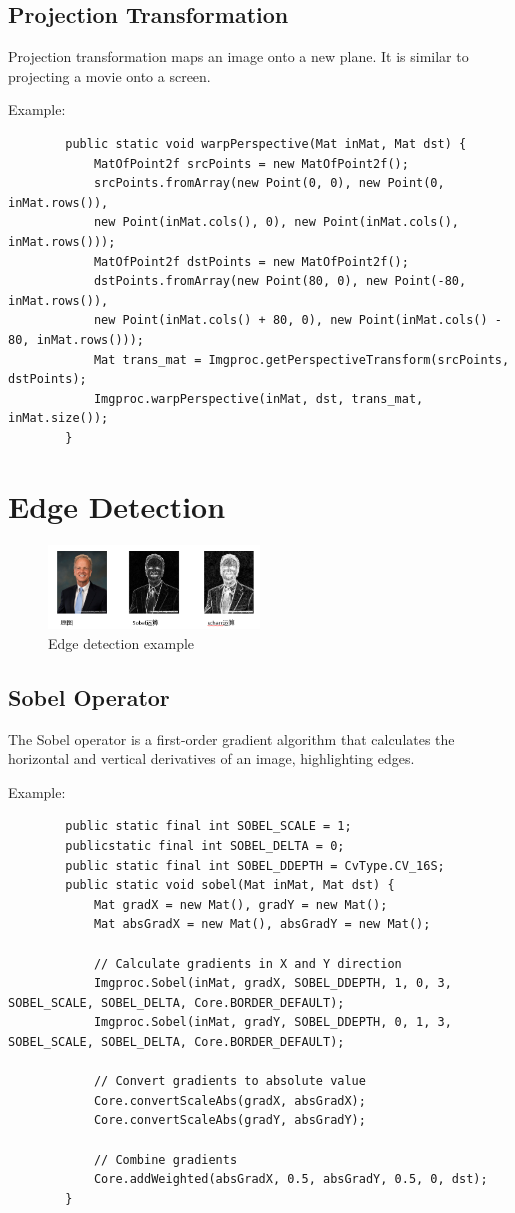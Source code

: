 \documentclass{article}
\begin{document}
	\subsection{Projection Transformation}
	Projection transformation maps an image onto a new plane. It is similar to projecting a movie onto a screen.
	
	Example:
	\begin{verbatim}
		public static void warpPerspective(Mat inMat, Mat dst) {
			MatOfPoint2f srcPoints = new MatOfPoint2f();
			srcPoints.fromArray(new Point(0, 0), new Point(0, inMat.rows()), 
			new Point(inMat.cols(), 0), new Point(inMat.cols(), inMat.rows()));
			MatOfPoint2f dstPoints = new MatOfPoint2f();
			dstPoints.fromArray(new Point(80, 0), new Point(-80, inMat.rows()), 
			new Point(inMat.cols() + 80, 0), new Point(inMat.cols() - 80, inMat.rows()));
			Mat trans_mat = Imgproc.getPerspectiveTransform(srcPoints, dstPoints);
			Imgproc.warpPerspective(inMat, dst, trans_mat, inMat.size());
		}
	\end{verbatim}
	
	\section{Edge Detection}
	\begin{figure}[h]
		\centering
		\includegraphics[width=0.5\textwidth]{mdpic/20240919165105.png}
		\caption{Edge detection example}
	\end{figure}
	
	\subsection{Sobel Operator}
	The Sobel operator is a first-order gradient algorithm that calculates the horizontal and vertical derivatives of an image, highlighting edges.
	
	Example:
	\begin{verbatim}
		public static final int SOBEL_SCALE = 1;
		publicstatic final int SOBEL_DELTA = 0;
		public static final int SOBEL_DDEPTH = CvType.CV_16S;
		public static void sobel(Mat inMat, Mat dst) {
			Mat gradX = new Mat(), gradY = new Mat();
			Mat absGradX = new Mat(), absGradY = new Mat();
			
			// Calculate gradients in X and Y direction
			Imgproc.Sobel(inMat, gradX, SOBEL_DDEPTH, 1, 0, 3, SOBEL_SCALE, SOBEL_DELTA, Core.BORDER_DEFAULT);
			Imgproc.Sobel(inMat, gradY, SOBEL_DDEPTH, 0, 1, 3, SOBEL_SCALE, SOBEL_DELTA, Core.BORDER_DEFAULT);
			
			// Convert gradients to absolute value
			Core.convertScaleAbs(gradX, absGradX);
			Core.convertScaleAbs(gradY, absGradY);
			
			// Combine gradients
			Core.addWeighted(absGradX, 0.5, absGradY, 0.5, 0, dst);
		}
		\end{verbatim}
		
\end{document}
